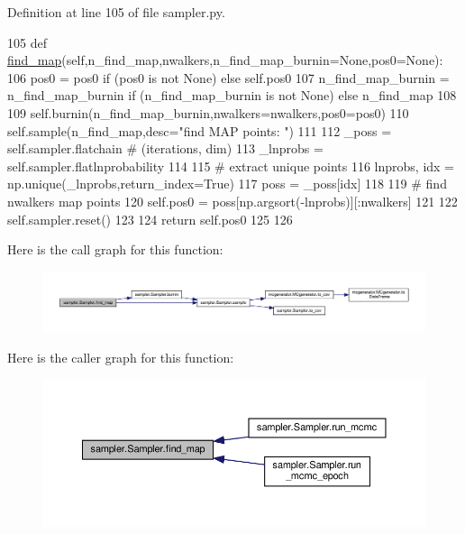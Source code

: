 Definition at line 105 of file sampler.\+py.


\begin{DoxyCode}
105     \textcolor{keyword}{def }\hyperlink{classsampler_1_1Sampler_ad7ddd812810028fad49c18ba7270f23f}{find\_map}(self,n\_find\_map,nwalkers,n\_find\_map\_burnin=None,pos0=None):
106         pos0 = pos0 \textcolor{keywordflow}{if} (pos0 \textcolor{keywordflow}{is} \textcolor{keywordflow}{not} \textcolor{keywordtype}{None}) \textcolor{keywordflow}{else} self.pos0
107         n\_find\_map\_burnin = n\_find\_map\_burnin \textcolor{keywordflow}{if} (n\_find\_map\_burnin \textcolor{keywordflow}{is} \textcolor{keywordflow}{not} \textcolor{keywordtype}{None}) \textcolor{keywordflow}{else} n\_find\_map
108         
109         self.burnin(n\_find\_map\_burnin,nwalkers=nwalkers,pos0=pos0)
110         self.sample(n\_find\_map,desc=\textcolor{stringliteral}{"find MAP points: "})
111         
112         \_poss = self.sampler.flatchain  \textcolor{comment}{# (iterations, dim)}
113         \_lnprobs = self.sampler.flatlnprobability
114         
115         \textcolor{comment}{# extract unique points}
116         lnprobs, idx = np.unique(\_lnprobs,return\_index=\textcolor{keyword}{True})
117         poss = \_poss[idx]
118         
119         \textcolor{comment}{# find nwalkers map points}
120         self.pos0 = poss[np.argsort(-lnprobs)][:nwalkers]
121         
122         self.sampler.reset()
123         
124         \textcolor{keywordflow}{return} self.pos0
125     
126     
\end{DoxyCode}
Here is the call graph for this function\+:\nopagebreak
\begin{figure}[H]
\begin{center}
\leavevmode
\includegraphics[width=350pt]{d3/d8a/classsampler_1_1Sampler_ad7ddd812810028fad49c18ba7270f23f_cgraph}
\end{center}
\end{figure}
Here is the caller graph for this function\+:\nopagebreak
\begin{figure}[H]
\begin{center}
\leavevmode
\includegraphics[width=350pt]{d3/d8a/classsampler_1_1Sampler_ad7ddd812810028fad49c18ba7270f23f_icgraph}
\end{center}
\end{figure}
